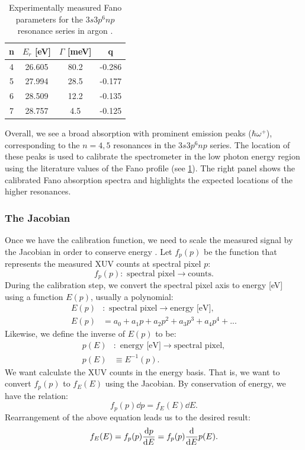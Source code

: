 \begin{table}[]
	\centering
	\begin{tabular}{c|c|c|c}
		n & $E_r$ {[}eV{]} & $\Gamma$ {[}meV{]} & q \\ \hline
		4 & 26.605 & 80.2 & -0.286 \\ \hline
		5 & 27.994 & 28.5 & -0.177 \\ \hline
		6 & 28.509 & 12.2 & -0.135 \\ \hline
		7 & 28.757 & 4.5 & -0.125
	\end{tabular}
	\caption{Experimentally measured Fano parameters for the $3s3p^6np$ resonance series in argon \cite{caretteMulticonfigurationalHartreeFockClosecoupling2013}.}
	\label{tab:fano-parameters}
\end{table}

Overall, we see a broad absorption with prominent emission peaks ($\hbar \omega^+$), corresponding to the $n=4,5$ resonances in the $3s3p^6np$ series. The location of these peaks is used to calibrate the spectrometer in the low photon energy region using the literature values of the Fano profile (see \cref{tab:fano-parameters}). The right panel shows the calibrated Fano absorption spectra and highlights the expected locations of the higher resonances.


\subsubsection{The Jacobian}
\label{sec:jacobian}

Once we have the calibration function, we need to scale the measured signal by the Jacobian in order to conserve energy \cite{mooneyGetBasicsRight2013}. Let $f_p(p)$ be the function that represents the measured XUV counts at spectral pixel $p$:
\begin{equation}
f_p(p): \textrm{ spectral pixel} \rightarrow \textrm{counts}.
\end{equation}
During the calibration step, we convert the spectral pixel axis to energy [eV] using a function $E(p)$, usually a polynomial:
\begin{align}
E(p)&: \textrm{ spectral pixel} \rightarrow \textrm{energy [eV]}, \\
E(p) &= a_0 + a_1 p + a_2 p^2 + a_3 p^3 + a_4 p^4 + ...
\end{align}
Likewise, we define the inverse of $E(p)$ to be:
\begin{align}
p(E)&: \textrm{ energy [eV]} \rightarrow \textrm{spectral pixel}, \\
p(E) &\equiv E^{-1}(p).
\end{align}
We want calculate the XUV counts in the energy basis. That is, we want to convert $f_p(p)$ to $f_E(E)$ using the Jacobian. By conservation of energy, we have the relation:
\begin{equation}
f_p (p) \dd{p} = f_E (E) \dd{E}.
\end{equation}
Rearrangement of the above equation leads us to the desired result:
\begin{equation}
f_E (E) = f_p (p) \dv{p}{E} = f_p (p) \dv{E} p(E).
\end{equation}

